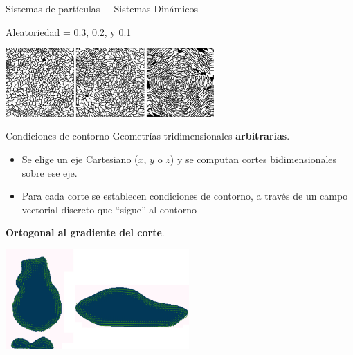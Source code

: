 \documentclass[spanish,unknownkeysallowed]{beamer}
\begin{document}

\begin{frame}{Sistemas de partículas + Sistemas Dinámicos}

\centering
Aleatoriedad = 0.3, 0.2, y 0.1

\vspace{0.1cm}
  \includegraphics[width=8cm]{../figures/Fig3}

\end{frame}

\begin{frame}{Condiciones de contorno}
Geometrías tridimensionales \textbf{arbitrarias}.

\begin{itemize}
\item Se elige un eje Cartesiano ($x$, $y$ o $z$) y se computan cortes bidimensionales sobre ese eje.
\item Para cada corte se establecen condiciones de contorno, a través de un campo vectorial discreto que ``sigue'' al contorno
\end{itemize}

\textbf{Ortogonal al gradiente del corte}.

  \centerline{\includegraphics[width=7cm]{../figures/Fig4}}
\end{frame}
\end{document}
